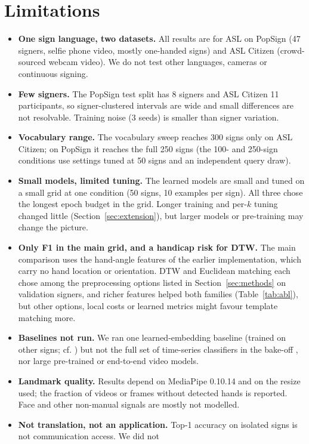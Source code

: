 \section{Limitations}
\label{sec:limits}
\begin{itemize}
\item \textbf{One sign language, two datasets.} All results are for ASL on PopSign (47 signers, selfie phone video, mostly one-handed
signs) and ASL Citizen (crowd-sourced webcam video). We do not test other languages, cameras or continuous signing.
\item \textbf{Few signers.} The PopSign test split has 8 signers and ASL Citizen 11 participants, so signer-clustered intervals are wide and small
differences are not resolvable. Training noise (3 seeds) is smaller than signer variation.
\item \textbf{Vocabulary range.} The vocabulary sweep reaches 300 signs only on ASL Citizen; on PopSign it reaches the full 250 signs (the 100- and 250-sign conditions use settings tuned at 50 signs and an independent query draw).
\item \textbf{Small models, limited tuning.} The learned models are small and tuned on a small grid at one condition
(50 signs, 10 examples per sign). All three chose the longest epoch budget in the grid. Longer training and per-$k$ tuning changed little (Section~\ref{sec:extension}), but larger models
or pre-training may change the picture.
\item \textbf{Only F1 in the main grid, and a handicap risk for DTW.} The main comparison uses the hand-angle features of the
earlier implementation, which carry no hand location or orientation. DTW and Euclidean matching each chose among the preprocessing
options listed in Section~\ref{sec:methods} on validation signers, and richer features helped both families (Table~\ref{tab:abl}), but other options, local costs or
learned metrics might favour template matching more.
\item \textbf{Baselines not run.} We ran one learned-embedding baseline (trained on other signs; cf. \citealp{vandendriessche2025onesh}) but not the full set of time-series classifiers in
the bake-off \citep{bagnall2017bakeoff}, nor large pre-trained or end-to-end video models.
\item \textbf{Landmark quality.} Results depend on MediaPipe 0.10.14 and on the resize used; the fraction of videos or frames
without detected hands is reported. Face and other non-manual signals are mostly not modelled.
\item \textbf{Not translation, not an application.} Top-1 accuracy on isolated signs is not communication access. We did not

\end{itemize}
